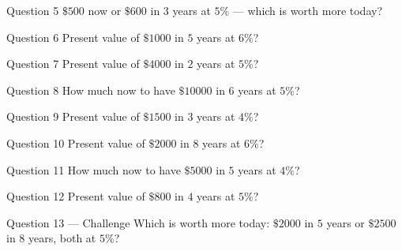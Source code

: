 \documentclass[11pt]{article}
\begin{document}
\begin{qbox}{Question 5}
$\$500$ now or $\$600$ in $3$ years at $5\%$ — which is worth more today?\workspace{2.4cm}
\end{qbox}

\begin{qbox}{Question 6}
Present value of $\$1000$ in $5$ years at $6\%$?\workspace{2.4cm}
\end{qbox}

\begin{qbox}{Question 7}
Present value of $\$4000$ in $2$ years at $5\%$?\workspace{2.4cm}
\end{qbox}

\begin{qbox}{Question 8}
How much now to have $\$10000$ in $6$ years at $5\%$?\workspace{2.4cm}
\end{qbox}

\begin{qbox}{Question 9}
Present value of $\$1500$ in $3$ years at $4\%$?\workspace{2.4cm}
\end{qbox}

\begin{qbox}{Question 10}
Present value of $\$2000$ in $8$ years at $6\%$?\workspace{2.4cm}
\end{qbox}

\begin{qbox}{Question 11}
How much now to have $\$5000$ in $5$ years at $4\%$?\workspace{2.4cm}
\end{qbox}

\begin{qbox}{Question 12}
Present value of $\$800$ in $4$ years at $5\%$?\workspace{2.4cm}
\end{qbox}

\begin{qbox}{Question 13 --- Challenge}
Which is worth more today: $\$2000$ in $5$ years or $\$2500$ in $8$ years, both at $5\%$?\workspace{3.5cm}
\end{qbox}

\clearpage
{}
\end{document}

